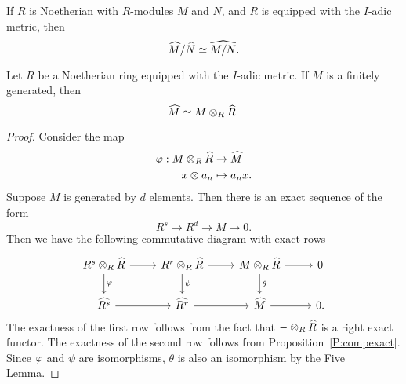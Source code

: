 \documentclass{ximera}
\begin{document}
\begin{corollary}
  If $R$ is Noetherian with $R$-modules $M$ and $N$, and $R$ is
  equipped with the $I$-adic metric, then
  \[
  \widehat{M}/\widehat{N} \simeq \widehat{M/N}.
  \]
\end{corollary}

\begin{corollary}
  Let $R$ be a Noetherian ring equipped with the $I$-adic metric. If
  $M$ is a finitely generated, then
  \[
  \widehat{M} \simeq M\otimes_R \widehat{R}.
  \]   
  \begin{proof}
    Consider the map 
    \begin{align*}
      \varphi: M \otimes_R \widehat{R} &\to \widehat{M} \\
      x \otimes a_n &\mapsto a_n x.
    \end{align*} 
    Suppose $M$ is generated by $d$ elements.  Then there is an exact
    sequence of the form
    \[
    R^s \to R^d \to M \to 0.
    \] 
    Then we have the following commutative diagram with exact rows
    \[
    \begin{tikzcd}
      R^s \tensor_R \hat{R} \ar[d,"\ph"] \ar[r] & R^r \tensor_R \hat{R} \ar[r] \ar[d,"\psi"] & M \tensor_R \hat{R} \ar[d,"\theta"] \ar[r] & 0 \\
      \hat{R^s} \ar[r] & \hat{R^r} \ar[r] & \hat{M} \ar[r] & 0.
    \end{tikzcd}
    \]
    The exactness of the first row follows from the fact that $-
    \otimes_R \widehat{R}$ is a right exact functor.  The exactness of the
    second row follows from Proposition~\ref{P:compexact}.  Since
    $\varphi$ and $\psi$ are isomorphisms, $\theta$ is also an isomorphism
    by the Five Lemma.
  \end{proof}
\end{corollary}
\end{document}

